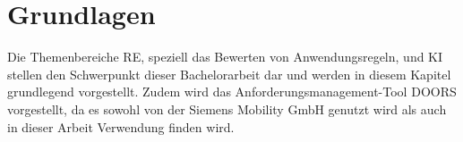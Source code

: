 \chapter{Grundlagen}
\label{chap:kapitel2}
Die Themenbereiche \ac{RE}, speziell das Bewerten von Anwendungsregeln, und \ac{KI} stellen den Schwerpunkt dieser Bachelorarbeit dar und werden in diesem Kapitel 
grundlegend vorgestellt. Zudem wird das Anforderungsmanagement-Tool \ac{DOORS} vorgestellt, da es sowohl von der Siemens Mobility GmbH genutzt wird als auch 
in dieser Arbeit Verwendung finden wird.





